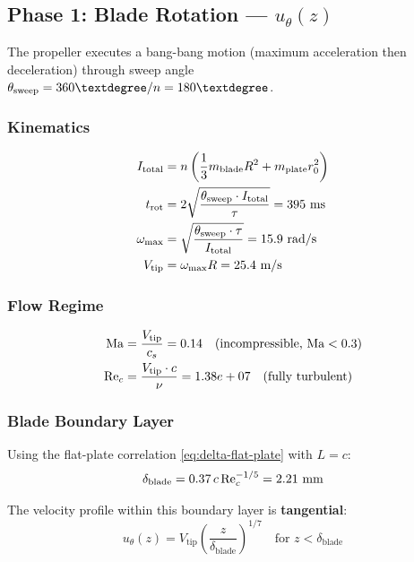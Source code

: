 \documentclass[11pt,a4paper]{article}
\begin{document}
\subsection{Phase 1: Blade Rotation --- $u_\theta(z)$}

The propeller executes a bang-bang motion (maximum acceleration then deceleration)
through sweep angle $\theta_\mathrm{sweep} = 360°/n = \sweepangle°$.

\subsubsection{Kinematics}

\begin{align}
  I_\mathrm{total} &= n \left(\frac{1}{3}m_\mathrm{blade}R^2 + m_\mathrm{plate}r_0^2\right) \\
  t_\mathrm{rot} &= 2\sqrt{\frac{\theta_\mathrm{sweep} \cdot I_\mathrm{total}}{\tau}} = 395~\text{ms} \\
  \omega_\mathrm{max} &= \sqrt{\frac{\theta_\mathrm{sweep} \cdot \tau}{I_\mathrm{total}}} = 15.9~\text{rad/s} \\
  V_\mathrm{tip} &= \omega_\mathrm{max} R = 25.4~\text{m/s}
\end{align}

\subsubsection{Flow Regime}

\begin{align}
  \mathrm{Ma} &= \frac{V_\mathrm{tip}}{c_s} = 0.14 \quad \text{(incompressible, Ma} < 0.3\text{)} \\
  \mathrm{Re}_c &= \frac{V_\mathrm{tip} \cdot c}{\nu} = 1.38e+07 \quad \text{(fully turbulent)}
\end{align}

\subsubsection{Blade Boundary Layer}

Using the flat-plate correlation \eqref{eq:delta-flat-plate} with $L = c$:
\begin{equation}
  \delta_\mathrm{blade} = 0.37 \, c \, \mathrm{Re}_c^{-1/5} = 2.21~\text{mm}
\end{equation}

The velocity profile within this boundary layer is \textbf{tangential}:
\begin{equation}
  \boxed{u_\theta(z) = V_\mathrm{tip} \left(\frac{z}{\delta_\mathrm{blade}}\right)^{1/7}
    \quad \text{for } z < \delta_\mathrm{blade}}
  \label{eq:u-theta}
\end{equation}
\end{document}
